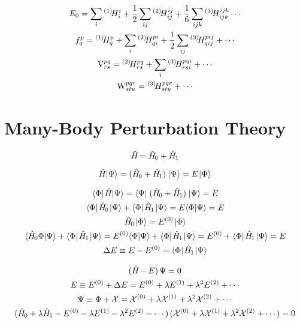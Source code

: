 \documentclass[thesis.tex]{subfiles}
\begin{document}
\begin{gather}
  E_{0} = \sum_{\mathclap{i}}\Hint{1}{i}{i} + \frac{1}{2}\sum_{\mathclap{ij}}\Hint{2}{ij}{ij} + \frac{1}{6}\sum_{\mathclap{ijk}}\Hint{3}{ijk}{ijk} \cdots \\
  \fint{p}{q} = \Hint{1}{p}{q} + \sum_{\mathclap{i}}\Hint{2}{pi}{qi} + \frac{1}{2}\sum_{\mathclap{ij}}\Hint{3}{pij}{qij} + \cdots \\
  \vint{pq}{rs} = \Hint{2}{pq}{rs} + \sum_{\mathclap{i}}\Hint{3}{pqi}{rsi} + \cdots \\
  \wint{pqr}{stu} = \Hint{3}{pqr}{stu} + \cdots
\end{gather}

\section{Many-Body Perturbation Theory}

\begin{equation}
  \hat{H}\hspace{-1.5pt} = \hat{H}\hspace{-1.5pt}_{0} + \hat{H}\hspace{-1.5pt}_{1}
\end{equation}

\begin{equation}
  \Ham\corrket = \mathop{(\Ham_{0} + \Ham_{1})}\corrket = E\corrket
\end{equation}

\begin{gather}
  \refbra\Ham\corrket = \corrbra\mathop{(\Ham_{0} + \Ham_{1})}\corrket = E \\
  \refbra\Ham_{0}\corrket + \refbra\Ham_{1}\corrket = E\braket{\Phi}{\Psi} = E \\
  \Ham_{0}\refket = E^{(0)}\refket \\
  \braket{\Ham_{0}\Phi}{\Psi} + \refbra\Ham_{1}\corrket = E^{(0)}\braket{\Phi}{\Psi} + \refbra\Ham_{1}\corrket = E^{(0)} + \refbra\Ham_{1}\corrket = E \\
  \Delta E \equiv E - E^{(0)} = \refbra\Ham_{1}\corrket
\end{gather}

\begin{gather}
  \mathop{(\hat{H}\hspace{-1.5pt} - E)}\Psi = 0 \\
  E \equiv E^{(0)} + \Delta E = E^{(0)} + \lambda E^{(1)} + \lambda^{2} E^{(2)} + \cdots \\
  \Psi \equiv \Phi + \mathcal{X} = \mathcal{X}^{(0)} + \lambda\mathcal{X}^{(1)} + \lambda^{2}\mathcal{X}^{(2)} + \cdots \\
  \mathop{(\hat{H}\hspace{-1.5pt}_{0} + \lambda\hat{H}\hspace{-1.5pt}_{1} - E^{(0)} - \lambda E^{(1)} - \lambda^{2} E^{(2)} - \cdots)}\mathop{(\mathcal{X}^{(0)} + \lambda\mathcal{X}^{(1)} + \lambda^{2}\mathcal{X}^{(2)} + \cdots)} = 0
\end{gather}
\end{document}
